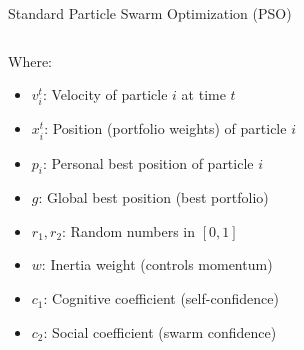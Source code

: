 \documentclass[aspectratio=169,xcolor=table]{beamer}
\begin{document}
\begin{frame}{Standard Particle Swarm Optimization (PSO)}
\begin{columns}
\begin{column}{0.45\textwidth}
      \vspace{0.3cm}
      Where:
      \begin{itemize}
        \item $v_i^t$: Velocity of particle $i$ at time $t$
        \item $x_i^t$: Position (portfolio weights) of particle $i$
        \item $p_i$: Personal best position of particle $i$
        \item $g$: Global best position (best portfolio)
        \item $r_1, r_2$: Random numbers in $[0,1]$
        \item $w$: Inertia weight (controls momentum)
        \item $c_1$: Cognitive coefficient (self-confidence)
        \item $c_2$: Social coefficient (swarm confidence)
      \end{itemize}
    \end{column}
  \end{columns}
\end{frame}
\end{document}
